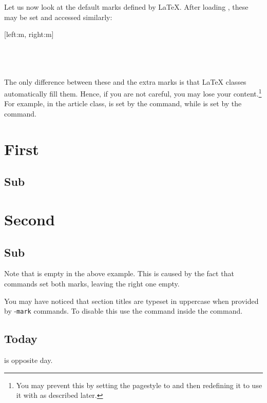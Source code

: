 Let us now look at the default marks defined by \LaTeX{}. After loading
, these may be set and accessed similarly:
\begin{lscommand}
  [left:m, right:m] \\
   \\
   \\
   \\
\end{lscommand}
The only difference between these and the extra marks is that \LaTeX{} classes
automatically fill them. Hence, if you are not careful, you may lose your
content.\footnote{You may prevent this by setting the pagestyle to
   and then redefining it to use it with  as
  described later.}
For example, in the article class,  is set by the 
command, while  is set by the  command.
\begin{example}[standalone, paperheight=5cm]
\geometry{includehead, includefoot, headsep=.5em, footskip=1em} %
\sloppy %
\usepackage{fancyhdr}%
\usepackage{extramarks}%
\pagestyle{fancy}%
\fancyhead[L]{\firstleftmark}
\fancyhead[R]{\lastleftmark}
\fancyfoot[L]{\firstrightmark}
\fancyfoot[R]{\lastrightmark}

\section{First}
\subsection{Sub}
\section{Second}
\subsection{Sub}
\end{example}
Note that  is empty in the above example. This is caused by
the fact that  commands set both marks, leaving the right one
empty.

You may have noticed that section titles are typeset in uppercase when provided
by -\texttt{mark} commands. To disable this use the  command inside the
 command.
\begin{example}[standalone, paperheight=3cm]
\geometry{includehead, includefoot, headsep=.5em, footskip=1em} %
\sloppy %
\usepackage{fancyhdr}%
\usepackage{extramarks}%
\pagestyle{fancy}%
\fancyhead[R]{%
  \nouppercase{\firstleftmark}%
}

\section{Today}
is opposite day.
\end{example}

